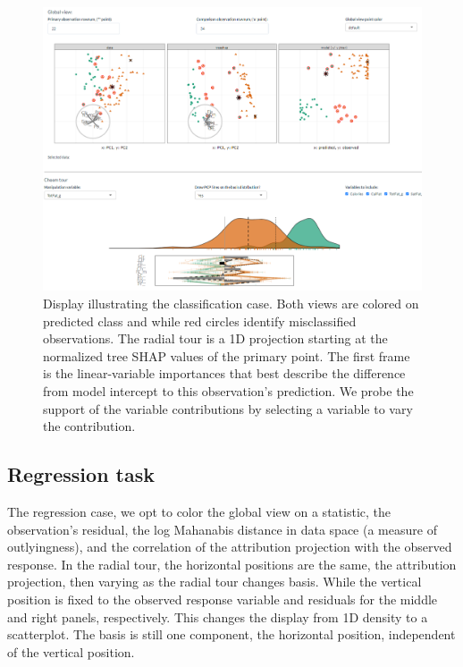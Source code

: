 \documentclass[
  article]{article}
\begin{document}
\begin{figure}

{\centering \includegraphics[width=1\linewidth]{./figures/app_classification} 

}

\caption{Display illustrating the classification case. Both views are colored on predicted class and while red circles identify misclassified observations. The radial tour is a 1D projection starting at the normalized tree SHAP values of the primary point. The first frame is the linear-variable importances that best describe the difference from model intercept to this observation's prediction. We probe the support of the variable contributions by selecting a variable to vary the contribution.}\label{fig:classificationcase}
\end{figure}

\hypertarget{regression-task}{%
\subsection{Regression task}\label{regression-task}}

The regression case, we opt to color the global view on a statistic, the observation's residual, the log Mahanabis distance in data space (a measure of outlyingness), and the correlation of the attribution projection with the observed response. In the radial tour, the horizontal positions are the same, the attribution projection, then varying as the radial tour changes basis. While the vertical position is fixed to the observed response variable and residuals for the middle and right panels, respectively. This changes the display from 1D density to a scatterplot. The basis is still one component, the horizontal position, independent of the vertical position.
\end{document}
